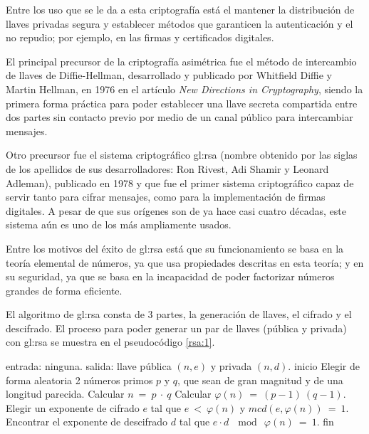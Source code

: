   Entre los uso que se le da a esta criptografía está el mantener la
  distribución de llaves privadas segura y establecer métodos que garanticen
  la autenticación y el no repudio; por ejemplo, en las firmas y
  certificados digitales.

  El principal precursor de la criptografía asimétrica fue el método de
  intercambio de llaves de Diffie-Hellman, desarrollado y publicado por
  Whitfield Diffie y Martin Hellman, en 1976 en el artículo \textit{New
  Directions in Cryptography}\cite{diffie_hellman}, siendo la primera
  forma práctica para poder establecer una llave secreta compartida
  entre dos partes sin contacto previo por medio de un canal público
  para intercambiar mensajes.

  Otro precursor fue el sistema criptográfico \gls{gl:rsa} (nombre
  obtenido por las siglas de los apellidos de sus desarrolladores: Ron Rivest,
  Adi Shamir y Leonard Adleman), publicado en 1978\cite{rsa_publicacion} y que
  fue el primer sistema criptográfico capaz de servir tanto para cifrar
  mensajes, como para la implementación de firmas digitales. A pesar de que sus
  orígenes son de ya hace casi cuatro décadas, este sistema aún es uno de los
  más ampliamente usados.

  Entre los motivos del éxito de \gls{gl:rsa} está que su funcionamiento
  se basa en la teoría elemental de números, ya que usa propiedades descritas
  en esta teoría; y en su seguridad, ya que se basa en la incapacidad de poder
  factorizar números grandes de forma eficiente.

  El algoritmo de \gls{gl:rsa} consta de 3 partes, la generación de llaves,
  el cifrado y el descifrado. El proceso para poder generar un par de llaves
  (pública y privada) con \gls{gl:rsa} se muestra en el pseudocódigo
  \ref{rsa:1}.

  \begin{pseudocodigo}[caption={Proceso de generación de llaves de
    \gls{gl:rsa}.}, label={rsa:1}]
    entrada: ninguna.
    salida:  llave pública $(n,e)$ y privada $(n,d)$.
    inicio
      Elegir de forma aleatoria 2 números primos $p$ y $q$, que sean de gran
      magnitud y de una longitud parecida.
      Calcular $n\: =\: p \:\cdot \:q$
      Calcular $\varphi(n) \:= \:(p-1) \:(q-1)$.
      Elegir un exponente de cifrado $e$ tal que $e \:< \:\varphi(n)$ y $mcd(e,\varphi(n)) \:= \:1$.
      Encontrar el exponente de descifrado $d$ tal que $e \cdot d \:\mod \:\varphi(n) \:= \:1$.
    fin
  \end{pseudocodigo}

